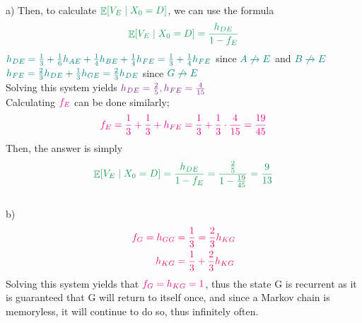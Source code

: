 \documentclass{solutionclass}
\renewcommand{\c}[1]{\color{#1}}
\newcommand{\f}[2]{\frac{#1}{#2}}
\newcommand{\x}{\cdot}
\newcommand{\tab}{ \hspace{3pt} }
\DeclareMathOperator{\EX}{\mathbb{E}}%
\begin{document}
\begin{enumerate}
\begin{solution}[]
 \\
a)\tab Then, to calculate $\c g \EX[V_E \mid X_0 = D]$, we can use the formula \[\c g \EX[V_E \mid X_0 = D] = \f{h_{DE}}{1 - f_E}\]
$\c t h_{DE} = \f13 + \f16 h_{AE} + \f14 h_{BE} + \f14 h_{FE} = \f13 + \f14 h_{FE}$ since $\c t A \not\rightarrow E$ and $\c t B \not\rightarrow E$ \\

$\c t h_{FE} = \f23 h_{DE} + \f13 h_{GE} = \f23 h_{DE}$ since $\c t G \not\rightarrow E$ \\

Solving this system yields $\c f h_{DE} = \f25, h_{FE} = \f{4}{15}$ \\

Calculating $\c m f_E$ can be done similarly; 
\[\c m f_E = \f13 + \f13 + h_{FE} = \f13 + \f13 \x \f{4}{15} = \f{19}{45}\]
Then, the answer is simply 
 \[\c g \EX[V_E \mid X_0 = D] = \f{h_{DE}}{1 - f_E} = \f{\f25}{1 - \f{19}{45}} = \f{9}{13}\] \\
 
 b)\tab \begin{align*}
 \c o f_G = h_{GG} &\c o = \f13 = \f23 h_{KG}  \\
 \c o h_{KG} &\c o = \f13 + \f23 h_{KG}  \\
 \end{align*}
Solving this system yields that $\c r f_G = h_{KG} = 1$, thus the state G is recurrent as it is guaranteed that G will return to itself once, and since a Markov chain is memoryless, it will continue to do so, thus infinitely often.  \\


\end{solution}
\end{enumerate}
\end{document}
